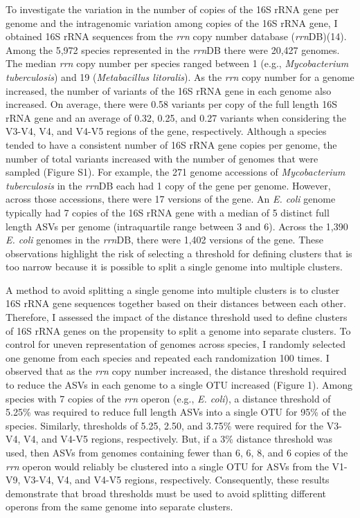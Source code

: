 \documentclass[
]{article}
\begin{document}
To investigate the variation in the number of copies of the 16S rRNA
gene per genome and the intragenomic variation among copies of the 16S
rRNA gene, I obtained 16S rRNA sequences from the \emph{rrn} copy number
database (\emph{rrn}DB)(14). Among the 5,972 species represented in the
\emph{rrn}DB there were 20,427 genomes. The median \emph{rrn} copy
number per species ranged between 1 (e.g., \emph{Mycobacterium
tuberculosis}) and 19 (\emph{Metabacillus litoralis}). As the \emph{rrn}
copy number for a genome increased, the number of variants of the 16S
rRNA gene in each genome also increased. On average, there were 0.58
variants per copy of the full length 16S rRNA gene and an average of
0.32, 0.25, and 0.27 variants when considering the V3-V4, V4, and V4-V5
regions of the gene, respectively. Although a species tended to have a
consistent number of 16S rRNA gene copies per genome, the number of
total variants increased with the number of genomes that were sampled
(Figure S1). For example, the 271 genome accessions of
\emph{Mycobacterium tuberculosis} in the \emph{rrn}DB each had 1 copy of
the gene per genome. However, across those accessions, there were 17
versions of the gene. An \emph{E. coli} genome typically had 7 copies of
the 16S rRNA gene with a median of 5 distinct full length ASVs per
genome (intraquartile range between 3 and 6). Across the 1,390 \emph{E.
coli} genomes in the \emph{rrn}DB, there were 1,402 versions of the
gene. These observations highlight the risk of selecting a threshold for
defining clusters that is too narrow because it is possible to split a
single genome into multiple clusters.

A method to avoid splitting a single genome into multiple clusters is to
cluster 16S rRNA gene sequences together based on their distances
between each other. Therefore, I assessed the impact of the distance
threshold used to define clusters of 16S rRNA genes on the propensity to
split a genome into separate clusters. To control for uneven
representation of genomes across species, I randomly selected one genome
from each species and repeated each randomization 100 times. I observed
that as the \emph{rrn} copy number increased, the distance threshold
required to reduce the ASVs in each genome to a single OTU increased
(Figure 1). Among species with 7 copies of the \emph{rrn} operon (e.g.,
\emph{E. coli}), a distance threshold of 5.25\% was required to reduce
full length ASVs into a single OTU for 95\% of the species. Similarly,
thresholds of 5.25, 2.50, and 3.75\% were required for the V3-V4, V4,
and V4-V5 regions, respectively. But, if a 3\% distance threshold was
used, then ASVs from genomes containing fewer than 6, 6, 8, and 6 copies
of the \emph{rrn} operon would reliably be clustered into a single OTU
for ASVs from the V1-V9, V3-V4, V4, and V4-V5 regions, respectively.
Consequently, these results demonstrate that broad thresholds must be
used to avoid splitting different operons from the same genome into
separate clusters.
\end{document}
